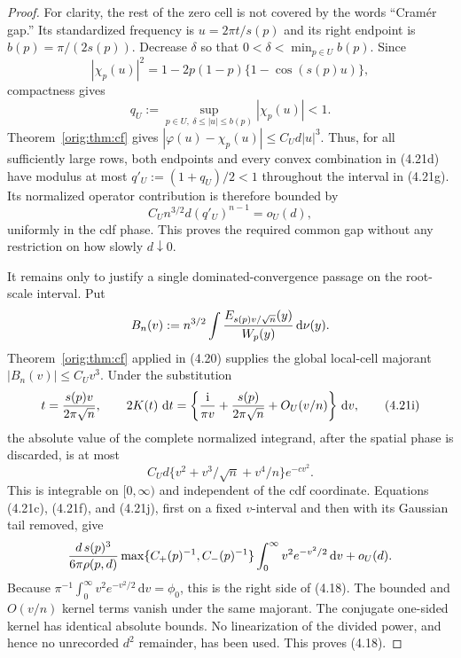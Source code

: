 \documentclass[11pt,a4paper]{article}
\numberwithin{equation}{section}
\theoremstyle{definition}
\theoremstyle{remark}
\newcommand{\ii}{\mathrm i}
\newcommand{\dd}{\,\mathrm d}
\begin{document}
\begin{proof}
For clarity, the rest of the zero cell is not covered by the words
``Cram\'er gap.''  Its standardized frequency is
$u=2\pi t/s(p)$ and its right endpoint is $b(p)=\pi/(2s(p))$.
Decrease $\delta$ so that $0<\delta<\min_{p\in U}b(p)$.  Since
\[
 |\chi_p(u)|^2=1-2p(1-p)\{1-\cos(s(p)u)\},
\]
compactness gives
\[
 q_U:=\sup_{p\in U,\ \delta\le |u|\le b(p)}|\chi_p(u)|<1.       \tag{4.21g}
\]
Theorem~\ref{orig:thm:cf} gives
$|\varphi(u)-\chi_p(u)|\le C_Ud|u|^3$.  Thus, for all sufficiently
large rows, both endpoints and every convex combination in (4.21d) have
modulus at most $q'_U:=(1+q_U)/2<1$ throughout the interval in
(4.21g).  Its normalized operator contribution is therefore bounded by
\[
 C_Un^{3/2}d(q'_U)^{n-1}=o_U(d),                       \tag{4.21h}
\]
uniformly in the cdf phase.  This proves the required common gap without
any restriction on how slowly $d\downarrow0$.

It remains only to justify a single dominated-convergence passage on the
root-scale interval.  Put
\[
 B_n(v):=n^{3/2}\int {E_{s(p)v/\sqrt n}(y)\over W_p(y)}\dd\nu(y).
\]
Theorem~\ref{orig:thm:cf} applied in (4.20) supplies the global local-cell
majorant $|B_n(v)|\le C_Uv^3$.  Under the substitution
\[
 t={s(p)v\over2\pi\sqrt n},\qquad
 2K(t)\,\dd t=\left\{{\ii\over\pi v}
       +{s(p)\over2\pi\sqrt n}+O_U(v/n)\right\}\dd v,             \tag{4.21i}
\]
the absolute value of the complete normalized integrand, after the
spatial phase is discarded, is at most
\[
 C_Ud\{v^2+v^3/\sqrt n+v^4/n\}e^{-cv^2}.              \tag{4.21j}
\]
This is integrable on $[0,\infty)$ and independent of the cdf coordinate.
Equations (4.21c), (4.21f), and (4.21j), first on a fixed $v$-interval
and then with its Gaussian tail removed, give
\[
 {d\,s(p)^3\over6\pi\rho(p,d)}
 \max\{C_+(p)^{-1},C_-(p)^{-1}\}
 \int_0^\infty v^2e^{-v^2/2}\dd v+o_U(d).
\]
Because $\pi^{-1}\int_0^\infty v^2e^{-v^2/2}\dd v=\phi_0$, this is
the right side of (4.18).  The bounded and $O(v/n)$ kernel terms vanish
under the same majorant.  The conjugate one-sided kernel has identical
absolute bounds.  No linearization of the divided power, and hence no
unrecorded $d^2$ remainder, has been used.  This proves (4.18).
\end{proof}
\end{document}
